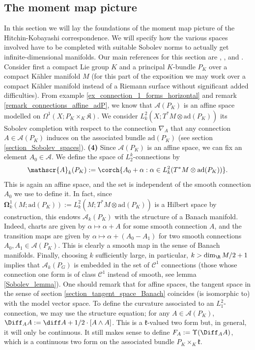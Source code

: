 \subsection{The moment map picture} \label{section_moment_map_picture}
{\color{violet}
In this section we will lay the foundations of the moment map picture of the Hitchin-Kobayashi correspondence. We will specify how the various spaces involved have to be completed with suitable Sobolev norms to actually get infinite-dimensional manifolds. Our main references for this section are \parencite{mitter1981bundle}, \parencite{trautwein2015surveygitpictureyangmills}, \parencite{BrongersMST} \parencite{LarsMartin_Notes_HK} and \parencite{Rudolph_2017pug}. \\

Consider first a compact Lie group \(K\) and a principal \(K\)-bundle \(P_K\) over a compact Kähler manifold \(M\) (for this part of the exposition we may work over a compact Kähler manifold instead of a Riemann surface without significant added difficulties). From example \ref{ex_connection_1_forms_horizontal} and remark \ref{remark_connections_affine_adP}, we know that \(\mathscr{A}(P_K)\) is an affine space modelled on \(\Omega^1(X; P_K \times _K \mathfrak{K})\). We consider \(L_k^2(X; T^*M \otimes \mathrm{ad}(P_K))\) its Sobolev completion with respect to the connection \(\nabla_A\) that any connection \(A\in \mathscr{A}(P_K)\) induces on the associated bundle \(\mathrm{ad}(P_K)\) (see section \ref{section_Sobolev_spaces}). \textbf{(4)} Since \(\mathscr{A}(P_K)\) is an affine space, we can fix an element \(A_0\in \mathscr{A}\). We define the space of \(L_2^k\)-connections by 
\[
\mathscr{A}_k(P_K):=\corch{A_0+\alpha : \alpha \in L_k^2(T^*M \otimes \mathrm{ad}(P_K))}.
\]
This is again an affine space, and the set is independent of the smooth connection \(A_0\) we use to define it. In fact, since \(\bm{\Omega}^1_k(M;\mathrm{ad}(P_K)):=L_k^2(M;T^*M \otimes \mathrm{ad}(P_K))\) is a Hilbert space by construction, this endows \(\mathscr{A}_k(P_K)\) with the structure of a Banach manifold. Indeed, charts are given by \(\alpha \mapsto \alpha + A\) for some smooth connection \(A\), and the transition maps are given by \(\alpha \mapsto \alpha + (A_0-A_1)\) for two smooth connections \(A_0, A_1 \in \mathscr{A}(P_K)\). This is clearly a smooth map in the sense of Banach manifolds. Finally, choosing \(k\) sufficiently large, in particular, \(k>\dim_\R M /2+1\) implies that \(\mathscr{A}_k(P_G)\) is embedded in the set of \(\mathscr{C}^1\) connections (those whose connection one form is of class \(\mathscr{C}^1\) instead of smooth, see lemma \ref{Sobolev_lemma}). One should remark that for affine spaces, the tangent space in the sense of section \ref{section_tangent_space_Banach} coincides (is isomorphic to) with the model vector space. To define the curvature associated to an \(L^2_1\)-connection, we may use the structure equation; for any \(A\in \mathscr{A}(P_K)\), \(\Diff_AA:=\diff A+1/2\cdot [A\wedge A]\). This is a \(\mathfrak{k}\)-valued two form but, in general, it will only be continuous. It still makes sense to define \(F_A:=\Upsilon(\Diff_AA)\), which is a continuous two form on the associated bundle \(P_K \times_K \mathfrak{k}\).  \\

}
